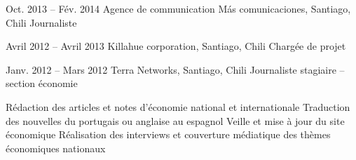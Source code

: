 \documentclass{tccv}
\begin{document}
\begin{textblock}{13}
\begin{mdframed}
\begin{eventlist}
\begin{itemize}
    \end{itemize}     

     
\item{Oct. 2013 -- Fév. 2014 }     
  {Agence de communication Más comunicaciones, Santiago, Chili}     
  {Journaliste}

\begin{itemize}
      \setlength\itemsep{0cm} 
      \cvitem[\checkmark] 
      \cvitem[\checkmark] 
      \cvitem[\checkmark] 
      \cvitem[\checkmark] 
\end{itemize}       



\item{Avril 2012 -- Avril 2013 }     
  {Killahue corporation, Santiago, Chili}     
  {Chargée de projet}

\begin{itemize}
      \setlength\itemsep{0cm} 
      \cvitem[\checkmark]  
      \cvitem[\checkmark]  
      \cvitem[\checkmark]  
      \cvitem[\checkmark]  

\end{itemize}      

  
  
\iffalse
\item{Janv. 2012 -- Mars 2012 }     
  {Terra Networks, Santiago, Chili}     
  {Journaliste stagiaire – section économie}

\begin{itemize}
      \setlength\itemsep{0cm} 
      \cvitem[\checkmark] Rédaction des articles et notes d’économie national et internationale
      \cvitem[\checkmark] Traduction des nouvelles du portugais ou anglaise au espagnol
      \cvitem[\checkmark] Veille et mise à jour du site économique
      \cvitem[\checkmark] Réalisation des interviews et couverture médiatique des thèmes économiques nationaux


\end{itemize}
\end{eventlist}
\end{mdframed}
\end{textblock}
\end{document}
